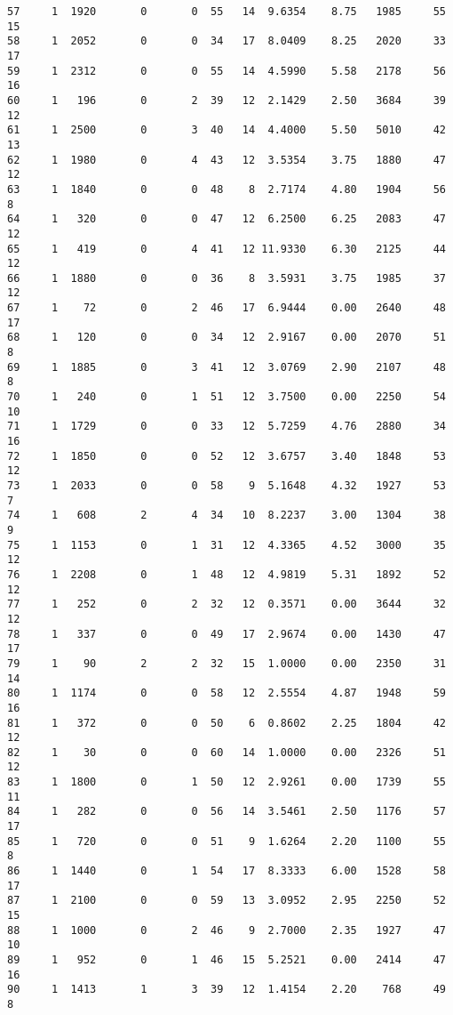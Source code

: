 \documentclass[
  letterpaper,
  DIV=11,
  numbers=noendperiod]{scrreprt}
\begin{document}
\begin{verbatim}
57     1  1920       0       0  55   14  9.6354    8.75   1985     55      15
58     1  2052       0       0  34   17  8.0409    8.25   2020     33      17
59     1  2312       0       0  55   14  4.5990    5.58   2178     56      16
60     1   196       0       2  39   12  2.1429    2.50   3684     39      12
61     1  2500       0       3  40   14  4.4000    5.50   5010     42      13
62     1  1980       0       4  43   12  3.5354    3.75   1880     47      12
63     1  1840       0       0  48    8  2.7174    4.80   1904     56       8
64     1   320       0       0  47   12  6.2500    6.25   2083     47      12
65     1   419       0       4  41   12 11.9330    6.30   2125     44      12
66     1  1880       0       0  36    8  3.5931    3.75   1985     37      12
67     1    72       0       2  46   17  6.9444    0.00   2640     48      17
68     1   120       0       0  34   12  2.9167    0.00   2070     51       8
69     1  1885       0       3  41   12  3.0769    2.90   2107     48       8
70     1   240       0       1  51   12  3.7500    0.00   2250     54      10
71     1  1729       0       0  33   12  5.7259    4.76   2880     34      16
72     1  1850       0       0  52   12  3.6757    3.40   1848     53      12
73     1  2033       0       0  58    9  5.1648    4.32   1927     53       7
74     1   608       2       4  34   10  8.2237    3.00   1304     38       9
75     1  1153       0       1  31   12  4.3365    4.52   3000     35      12
76     1  2208       0       1  48   12  4.9819    5.31   1892     52      12
77     1   252       0       2  32   12  0.3571    0.00   3644     32      12
78     1   337       0       0  49   17  2.9674    0.00   1430     47      17
79     1    90       2       2  32   15  1.0000    0.00   2350     31      14
80     1  1174       0       0  58   12  2.5554    4.87   1948     59      16
81     1   372       0       0  50    6  0.8602    2.25   1804     42      12
82     1    30       0       0  60   14  1.0000    0.00   2326     51      12
83     1  1800       0       1  50   12  2.9261    0.00   1739     55      11
84     1   282       0       0  56   14  3.5461    2.50   1176     57      17
85     1   720       0       0  51    9  1.6264    2.20   1100     55       8
86     1  1440       0       1  54   17  8.3333    6.00   1528     58      17
87     1  2100       0       0  59   13  3.0952    2.95   2250     52      15
88     1  1000       0       2  46    9  2.7000    2.35   1927     47      10
89     1   952       0       1  46   15  5.2521    0.00   2414     47      16
90     1  1413       1       3  39   12  1.4154    2.20    768     49       8

\end{verbatim}
\end{document}
